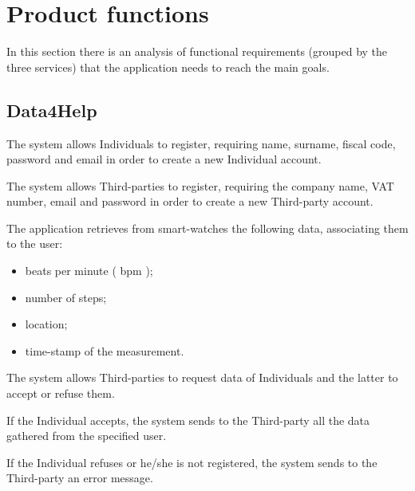 \section{Product functions}

In this section there is an analysis of functional requirements (grouped by the three services) that the application needs to reach the main goals. 



\subsection{Data4Help}
\begin{enumerate}[label={[}R1.\arabic*{]}, leftmargin=*]

    \item \label{R1-Individual-registration} The system allows Individuals to register, requiring name, surname, fiscal code, password and email in order to create a new Individual account.

    \item \label{R1-third-party-registration} The system allows Third-parties to register, requiring the company name, VAT number, email and password in order to create a new Third-party account.
    
    \item \label{R1-gathered-data} The application retrieves from smart-watches the following data, associating them to the user: 
    \begin{itemize}
        \item beats per minute ( bpm );
        \item number of steps;
        \item location;
        \item time-stamp of the measurement.
    \end{itemize}
    
    \item \label{R1-individual-request} The system allows Third-parties to request data of Individuals and the latter to accept or refuse them. 
    \begin{enumerate}[label={[}R1.\arabic{enumi}.\arabic*{]}, leftmargin=*]
        \item \label{R1-individual-accept-request} If the Individual accepts, the system sends to the Third-party all the data gathered from the specified user.
    
        \item \label{R1-individual-refused-request} If the Individual refuses or he/she is not registered, the system sends to the Third-party an error message.
    \end{enumerate}
    

\end{enumerate}
